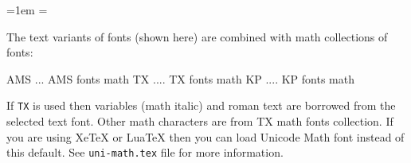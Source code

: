\parindent=1em
\ifx\sizespec\empty \def\sizespec{at10pt}\fi
{}\currtt=\tentt
\ifx\loadmathfonts\undefined \let\loadmathfonts=\relax \fi
\let\fontfamexec=\fontfamexecC
\ifx\fontfamsample\undefined
   \def\fontfamsample{ABCDabcd Qsty fi fl áéíóúüů řžč ÁÉÍÓÚ ŘŽČ 0123456789}
   \ifx\chyph\undefined \ismacro{}\iftrue
   \def\fontfamsample{ABCDabcd Qsty fi fl 
      \char225\char233\char237\char243\char250\char252\char183{ }%
      \char176\char186\char163{ }%
      \char193\char201\char205\char211\char218\char220\char151{ }%
      \char144\char154\char130{ }0123456789}     
\fi\fi\fi
\def\detok#1{\expandafter\detokA\meaning#1}\def\detokA#1->{}
\fontfamL
\endgroup

\bigskip
\noindent
The text variants of fonts (shown here) are combined with math collections
of fonts:

\begtt
AMS ... AMS fonts math
TX .... TX fonts math
KP .... KP fonts math
\endtt

If {\tt TX} is used then variables (math italic) and roman text are borrowed
from the selected text font. Other math characters are from TX math fonts
collection.
If you are using Xe\TeX{} or Lua\TeX{} then you can load Unicode Math font
instead of this default. See {\tt uni-math.tex} file for more information.


\endinput

